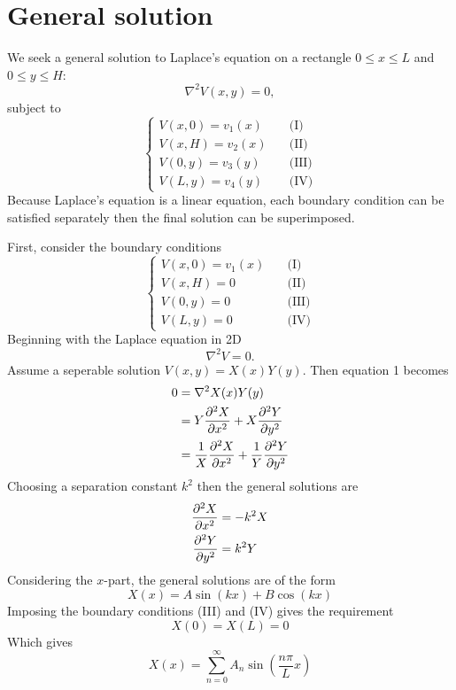 \documentclass{report}
\begin{document}
\section{General solution}
  We seek a general solution to Laplace's equation on a rectangle $0\leq x \leq L$ and $0\leq y \leq H$:
  \begin{equation}
    \nabla^2 V(x,y) = 0,
  \end{equation}
  subject to
  \begin{equation}
    \begin{cases}
      V(x,0) = v_1(x) &\quad \text{(I)}\\
      V(x,H) = v_2(x) &\quad \text{(II)}\\
      V(0,y) = v_3(y) &\quad \text{(III)}\\
      V(L,y) = v_4(y) &\quad \text{(IV)}
    \end{cases}
  \end{equation}
  Because Laplace's equation is a linear equation, each boundary condition can be satisfied separately then the final solution can be superimposed.

  First, consider the boundary conditions
  \begin{equation}
    \begin{cases}
      V(x,0) = v_1(x) &\quad \text{(I)}\\
      V(x,H) = 0 &\quad \text{(II)}\\
      V(0,y) = 0 &\quad \text{(III)}\\
      V(L,y) = 0 &\quad \text{(IV)}
    \end{cases}
  \end{equation}
  Beginning with the Laplace equation in 2D
  \begin{equation}
    \nabla^2 V = 0.
  \end{equation}
  Assume a seperable solution $V(x,y) = X(x)Y(y)$. Then equation 1 becomes
  \begin{align}
    0 &= \nabla^2 X(x)Y(y)\\
    &= Y\pdv[2]{X}{x} + X\pdv[2]{Y}{y} \\
    & = \frac{1}{X}\pdv[2]{X}{x} + \frac{1}{Y}\pdv[2]{Y}{y}
  \end{align}
  Choosing a separation constant $k^2$ then the general solutions are
  \begin{align}
    \pdv[2]{X}{x} &= -k^2X\\
    \pdv[2]{Y}{y} &= k^2Y
  \end{align}
  Considering the $x$-part, the general solutions are of the form
  \begin{equation}
    X(x) = A \sin(kx) + B \cos(kx)
  \end{equation}
  Imposing the boundary conditions (III) and (IV) gives the requirement
  \begin{equation}
    X(0) = X(L) = 0
  \end{equation}
  Which gives
  \begin{equation}
    X(x) = \sum_{n=0}^\infty A_n\sin(\frac{n\pi}{L}x)
  \end{equation}
\end{document}
